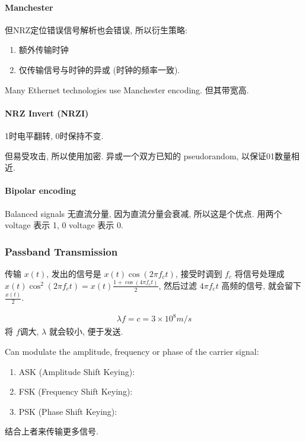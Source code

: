 \paragraph{Manchester}但NRZ定位错误信号解析也会错误, 所以衍生策略:
\begin{enumerate}
    \item 额外传输时钟
    \item 仅传输信号与时钟的异或 (时钟的频率一致). 
\end{enumerate}
Many Ethernet technologies use Manchester encoding. 但其带宽高. 

\paragraph{NRZ Invert (NRZI)} 1时电平翻转, 0时保持不变. 

但易受攻击, 所以使用加密. 异或一个双方已知的 pseudorandom, 以保证01数量相近. 

\paragraph{Bipolar encoding}Balanced signals 无直流分量, 因为直流分量会衰减, 所以这是个优点. 用两个 voltage 表示 1, 0 voltage 表示 0. 

\subsubsection{Passband Transmission}
传输 $x(t)$, 发出的信号是 $x(t)\cos (2\pi f_c t)$, 接受时调到 $f_c$ 将信号处理成 $x(t)\cos^2 (2\pi f_c t)=x(t)\frac{1+\cos (4\pi f_c t)}{2}$, 然后过滤 $4\pi f_c t$ 高频的信号, 就会留下 $\frac{x(t)}{2}$. 

\begin{align*}
    \lambda f=c=3\times 10^8 m/s
\end{align*}
将 $f$调大, $\lambda$ 就会较小, 便于发送. 



Can modulate the amplitude, frequency or phase of the carrier signal:
\begin{enumerate}
    \item ASK (Amplitude Shift Keying): 
    \item FSK (Frequency Shift Keying): 
    \item PSK (Phase Shift Keying): 
\end{enumerate}

结合上者来传输更多信号. 



